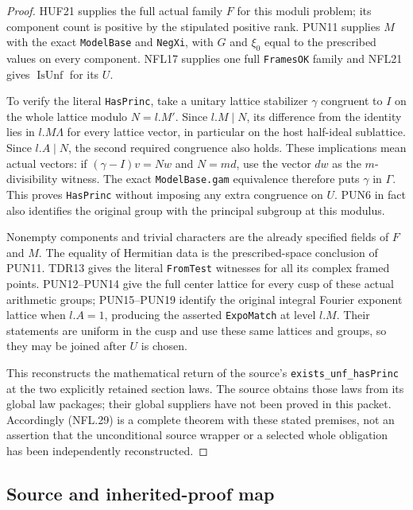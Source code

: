 \begin{proof}
HUF21 supplies the full actual family $F$ for this moduli
problem; its component count is positive by the stipulated
positive rank.  PUN11 supplies $M$ with the exact
\texttt{ModelBase} and \texttt{NegXi}, with $G$ and $\xi_0$
equal to the prescribed values on every component.  NFL17
supplies one full \texttt{FramesOK} family and NFL21 gives
$\operatorname{IsUnf}$ for its $U$.

To verify the literal \texttt{HasPrinc}, take a unitary lattice
stabilizer $\gamma$ congruent to $I$ on the whole lattice
modulo $N=l.M'$.  Since $l.M\mid N$, its difference from
the identity lies in $l.M\Lambda$ for every lattice vector,
in particular on the host half-ideal sublattice.  Since
$l.A\mid N$, the second required congruence also holds.
These implications mean actual vectors: if
$(\gamma-I)v=Nw$ and $N=md$, use the vector $dw$ as the
$m$-divisibility witness.  The exact \texttt{ModelBase.gam}
equivalence therefore puts $\gamma$ in $\Gamma$.
This proves \texttt{HasPrinc} without imposing any extra
congruence on $U$.  PUN6 in fact also identifies the original
group with the principal subgroup at this modulus.

Nonempty components and trivial characters are the already
specified fields of $F$ and $M$.  The equality of Hermitian
data is the prescribed-space conclusion of PUN11.  TDR13
gives the literal \texttt{FromTest} witnesses for all its
complex framed points.  PUN12--PUN14 give the full center
lattice for every cusp of these actual arithmetic groups;
PUN15--PUN19 identify the original integral Fourier exponent
lattice when $l.A=1$, producing the asserted
\texttt{ExpoMatch} at level $l.M$.  Their statements are
uniform in the cusp and use these same lattices and groups,
so they may be joined after $U$ is chosen.

This reconstructs the mathematical return of the source's
\texttt{exists\_unf\_hasPrinc} at the two explicitly retained
section laws.  The source obtains those laws from its global
law packages; their global suppliers have not been proved in
this packet.  Accordingly (NFL.29) is a complete theorem
with these stated premises, not an assertion that the
unconditional source wrapper or a selected whole obligation
has been independently reconstructed.
\end{proof}

\subsection{Source and inherited-proof map}

